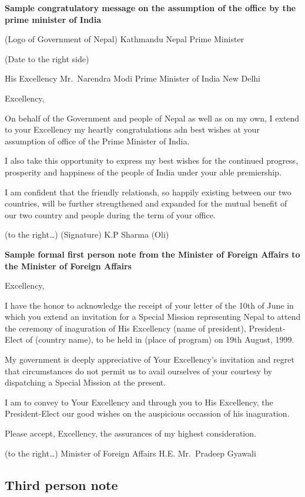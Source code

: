 \documentclass[
  openany]{book}
\begin{document}
\textbf{Sample congratulatory message on the assumption of the office by the prime minister of India}

(Logo of Government of Nepal)
Kathmandu Nepal
Prime Minister

(Date to the right side)

His Excellency
Mr.~Narendra Modi
Prime Minister of India
New Delhi

Excellency,

On behalf of the Government and people of Nepal as well as on my own, I extend to your Excellency my heartly congratulations adn best wishes at your assumption of office of the Prime Minister of India.

I also take this opportunity to express my best wishes for the continued progress, prosperity and happiness of the people of India under your able premiership.

I am confident that the friendly relationsh, so happily existing between our two countries, will be further strengthened and expanded for the mutual benefit of our two country and people during the term of your office.

(to the right\ldots)
(Signature)
K.P Sharma (Oli)

\textbf{Sample formal first person note from the Minister of Foreign Affairs to the Minister of Foreign Affairs}

Excellency,

I have the honor to acknowledge the receipt of your letter of the 10th of June in which you extend an invitation for a Special Mission representing Nepal to attend the ceremony of inaguration of His Excellency (name of president), President-Elect of (country name), to be held in (place of program) on 19th August, 1999.

My government is deeply appreciative of Your Excellency's invitation and regret that circumstances do not permit us to avail ourselves of your courtesy by dispatching a Special Mission at the present.

I am to convey to Your Excellency and through you to His Excellency, the President-Elect our good wishes on the auspicious occassion of his inaguration.

Please accept, Excellency, the assurances of my highest consideration.

(to the right\ldots)
Minister of Foreign Affairs
H.E. Mr.~Pradeep Gyawali

\hypertarget{third-person-note}{%
\subsection{Third person note}\label{third-person-note}}
\end{document}
